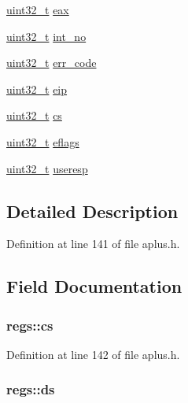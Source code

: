 \begin{DoxyCompactItemize}
\hyperlink{aplus_8h_a53a0df51603c77c2aa5b9ea61b606a82}{uint32\+\_\+t} \hyperlink{structregs_a8fa1f22a8e8ac6908cc7710c8396f9dc}{eax}
\item 
\hyperlink{aplus_8h_a53a0df51603c77c2aa5b9ea61b606a82}{uint32\+\_\+t} \hyperlink{structregs_ae15fe95c86d4f1c84d475f3d709286b5}{int\+\_\+no}
\item 
\hyperlink{aplus_8h_a53a0df51603c77c2aa5b9ea61b606a82}{uint32\+\_\+t} \hyperlink{structregs_a938e9e8adf0d430fefc20bea83650718}{err\+\_\+code}
\item 
\hyperlink{aplus_8h_a53a0df51603c77c2aa5b9ea61b606a82}{uint32\+\_\+t} \hyperlink{structregs_a69756a0c0f29041c01160de72c4163b8}{eip}
\item 
\hyperlink{aplus_8h_a53a0df51603c77c2aa5b9ea61b606a82}{uint32\+\_\+t} \hyperlink{structregs_a2d8cf067e67462a631c823b368ce67c4}{cs}
\item 
\hyperlink{aplus_8h_a53a0df51603c77c2aa5b9ea61b606a82}{uint32\+\_\+t} \hyperlink{structregs_a795e8ffcd28d56b617a2d535b2d1394c}{eflags}
\item 
\hyperlink{aplus_8h_a53a0df51603c77c2aa5b9ea61b606a82}{uint32\+\_\+t} \hyperlink{structregs_af7e777e1535d887de07a5bf3d11eb15f}{useresp}
\end{DoxyCompactItemize}


\subsection{Detailed Description}


Definition at line 141 of file aplus.\+h.



\subsection{Field Documentation}
\hypertarget{structregs_a2d8cf067e67462a631c823b368ce67c4}{
\subsubsection[{cs}]{ regs\+::cs}}\label{structregs_a2d8cf067e67462a631c823b368ce67c4}


Definition at line 142 of file aplus.\+h.

\hypertarget{structregs_aa29daa3553339a188913853a1d91e30a}{
\subsubsection[{ds}]{ regs\+::ds}}\label{structregs_aa29daa3553339a188913853a1d91e30a}



